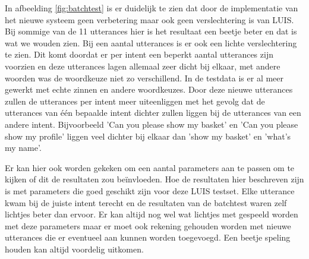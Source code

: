 In afbeelding \ref{fig:batchtest} is er duidelijk te zien dat door de implementatie van het nieuwe systeem geen verbetering maar ook geen verslechtering is van LUIS. Bij sommige van de 11 utterances hier is het resultaat een beetje beter en dat is wat we wouden zien. Bij een aantal utterances is er ook een lichte verslechtering te zien. Dit komt doordat er per intent een beperkt aantal utterances zijn voorzien en deze utterances lagen allemaal zeer dicht bij elkaar, met andere woorden was de woordkeuze niet zo verschillend. In de testdata is er al meer gewerkt met echte zinnen en andere woordkeuzes. Door deze nieuwe utterances zullen de utterances per intent meer uiteenliggen met het gevolg dat de utterances van één bepaalde intent dichter zullen liggen bij de utterances van een andere intent. Bijvoorbeeld 'Can you please show my basket' en 'Can you please show my profile' liggen veel dichter bij elkaar dan 'show my basket' en 'what's my name'.

Er kan hier ook worden gekeken om een aantal parameters aan te passen om te kijken of dit de resultaten zou beïnvloeden. Hoe de resultaten hier beschreven zijn is met parameters die goed geschikt zijn voor deze LUIS testset. Elke utterance kwam bij de juiste intent terecht en de resultaten van de batchtest waren zelf lichtjes beter dan ervoor. Er kan altijd nog wel wat lichtjes met gespeeld worden met deze parameters maar er moet ook rekening gehouden worden met nieuwe utterances die er eventueel aan kunnen worden toegevoegd. Een beetje speling houden kan altijd voordelig uitkomen.


